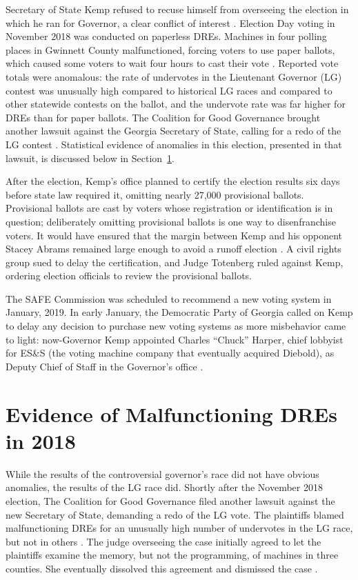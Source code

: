 \documentclass[runningheads]{llncs}
\begin{document}
Secretary of State Kemp refused to recuse himself from overseeing the election in which he ran for Governor, 
a clear conflict of interest \cite{williams_georgia_2018}.
Election Day voting in November 2018 was conducted on paperless DREs.
Machines in four polling places in Gwinnett County malfunctioned, forcing
voters to use paper ballots, which caused some voters to wait four hours to cast their vote \cite{lockhart_voting_2018}.
Reported vote totals were anomalous: 
the rate of undervotes in the Lieutenant Governor (LG) contest was unusually high
compared to historical LG races and compared to other
statewide contests on the ballot, and the undervote rate was far higher for DREs than for
paper ballots.
The Coalition for Good Governance brought another lawsuit against the Georgia
Secretary of State, calling for a redo of the LG contest \cite{coalition_crittenden_2019}.
Statistical evidence of anomalies in this election, presented in that lawsuit, is discussed 
below in Section~\ref{sec:ga_stats}.

After the election, Kemp's office planned to certify the election results six days before state law required it,
omitting nearly 27,000 provisional ballots.
Provisional ballots are cast by voters whose registration or identification is in question;
deliberately omitting provisional ballots is one way to disenfranchise voters.
It would have ensured that the margin between Kemp and his opponent Stacey Abrams remained 
large enough to avoid a runoff election \cite{blinder_federal_2018}.
A civil rights group sued to delay the certification, and
Judge Totenberg ruled against Kemp,
ordering election officials to review the provisional ballots.

The SAFE Commission was scheduled to recommend a new voting system in January, 2019.
In early January, the Democratic Party of Georgia called on Kemp to delay any decision to purchase
new voting systems as more misbehavior came to light:
now-Governor Kemp appointed Charles ``Chuck'' Harper, chief lobbyist for ES\&S (the voting machine
company that eventually acquired Diebold), as Deputy Chief of Staff in the Governor's office \cite{noauthor_SAFE_2019}.

 
\section{Evidence of Malfunctioning DREs in 2018}\label{sec:ga_stats}

While the results of the controversial governor's race did not have obvious anomalies, the results of the LG race did.
Shortly after the November 2018 election, The Coalition for Good Governance  filed another lawsuit 
against the new Secretary of State, demanding a redo of the LG vote.
The plaintiffs blamed malfunctioning DREs for an unusually high number of undervotes in the LG race, but not in others \cite{coalition_crittenden_2019}.
The judge overseeing the case initially agreed to let the plaintiffs examine the memory, but not the programming, of machines in three counties.
She eventually dissolved this agreement and dismissed the case \cite{zetter_georgia_2019}.
\end{document}
